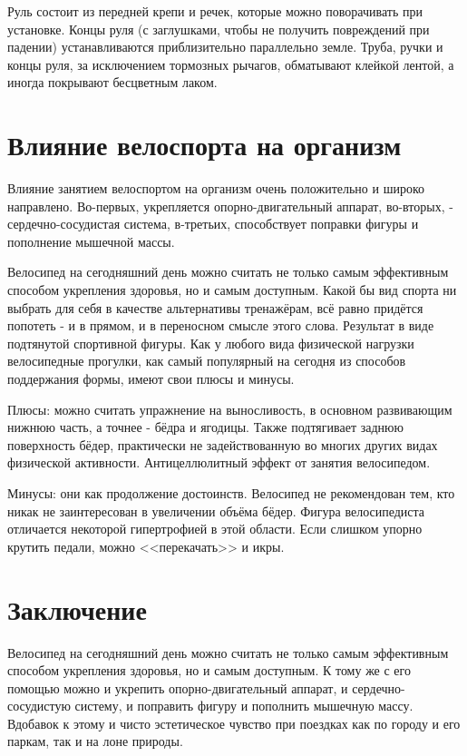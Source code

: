 \documentclass[a4paper,14pt]{extreport}
\begin{document}
Руль состоит из передней крепи и речек, которые можно поворачивать при установке. Концы руля (с заглушками, чтобы не получить повреждений при падении) устанавливаются приблизительно параллельно земле. Труба, ручки и концы руля, за исключением тормозных рычагов, обматывают клейкой лентой, а иногда покрывают бесцветным лаком.

\chapter{Влияние велоспорта на организм}

Влияние занятием велоспортом на организм очень положительно и широко направлено. Во-первых, укрепляется опорно-двигательный аппарат, во-вторых, - сердечно-сосудистая система, в-третьих, способствует поправки фигуры и пополнение мышечной массы.

Велосипед на сегодняшний день можно считать не только самым эффективным способом укрепления здоровья, но и самым доступным. Какой бы вид спорта ни выбрать для себя в качестве альтернативы тренажёрам, всё равно придётся попотеть - и в прямом, и в переносном смысле этого слова. Результат в виде подтянутой спортивной фигуры. Как у любого вида физической нагрузки велосипедные прогулки, как самый популярный на сегодня из способов поддержания формы, имеют свои плюсы и минусы.

Плюсы: можно считать упражнение на выносливость, в основном развивающим нижнюю часть, а точнее - бёдра и ягодицы. Также подтягивает заднюю поверхность бёдер, практически не задействованную во многих других видах физической активности. Антицеллюлитный эффект от занятия велосипедом.

Минусы: они как продолжение достоинств. Велосипед не рекомендован тем, кто никак не заинтересован в увеличении объёма бёдер. Фигура велосипедиста отличается некоторой гипертрофией в этой области. Если слишком упорно крутить педали, можно <<перекачать>> и икры. 

\chapter*{Заключение}

Велосипед на сегодняшний день можно считать не только самым эффективным способом укрепления здоровья, но и самым доступным. К тому же с его помощью можно и укрепить опорно-двигательный аппарат, и сердечно-сосудистую систему, и поправить фигуру и пополнить мышечную массу. Вдобавок к этому и чисто эстетическое чувство при поездках как по городу и его паркам, так и на лоне природы.
\end{document}
